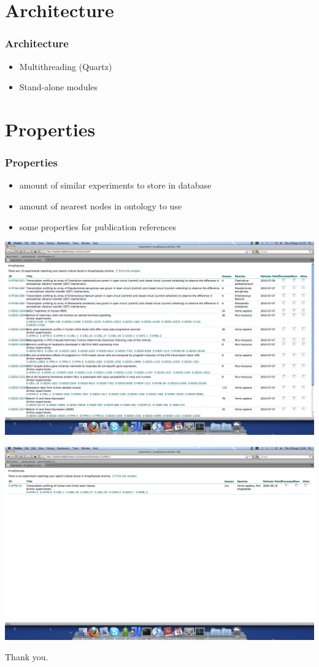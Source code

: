 \documentclass[utf8,handout]{beamer}
\begin{document}
\section{Architecture}
  \begin{frame}
    \frametitle{Architecture}  
	\begin{itemize}
		\item Multithreading (Quartz)
		\item Stand-alone modules
	\end{itemize}
  \end{frame}

\section{Properties}
  \begin{frame}
    \frametitle{Properties}  
	\begin{itemize}
		\item amount of similar experiments to store in database
		\item amount of nearest nodes in ontology to use
		\item some properties for publication references
	\end{itemize}
  \end{frame}

  \begin{frame}
		\includegraphics[width=1.3\textwidth]{./ScreenShot_1}       	
  \end{frame}
  \begin{frame}
		\includegraphics[width=1.3\textwidth]{./ScreenShot_2}       	
  \end{frame}
  
  \begin{frame}
		\begin{center}
{
\LARGE{\LARGE{Thank you.}}
}
\end{center}
  \end{frame}
\end{document}
